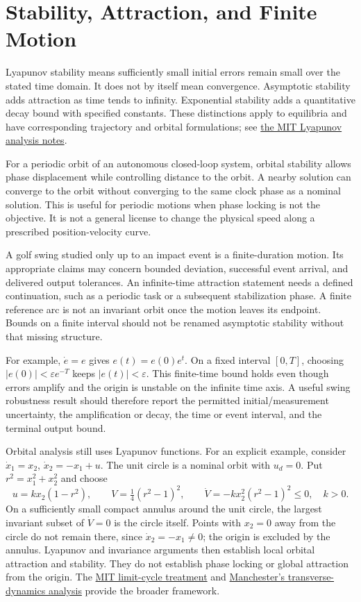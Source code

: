 \documentclass[12pt, openany]{book}
\theoremstyle{plain}
\begin{document}
\section{Stability, Attraction, and Finite Motion}

Lyapunov stability means sufficiently small initial errors remain small over
the stated time domain. It does not by itself mean convergence. Asymptotic
stability adds attraction as time tends to infinity. Exponential stability adds
a quantitative decay bound with specified constants. These distinctions apply
to equilibria and have corresponding trajectory and orbital formulations; see
\href{https://underactuated.mit.edu/lyapunov.html}{the MIT Lyapunov analysis notes}.

For a periodic orbit of an autonomous closed-loop system, orbital stability
allows phase displacement while controlling distance to the orbit. A nearby
solution can converge to the orbit without converging to the same clock phase
as a nominal solution. This is useful for periodic motions when phase locking
is not the objective. It is not a general license to change the physical speed
along a prescribed position-velocity curve.

A golf swing studied only up to an impact event is a finite-duration motion.
Its appropriate claims may concern bounded deviation, successful event arrival,
and delivered output tolerances. An infinite-time attraction statement needs
a defined continuation, such as a periodic task or a subsequent stabilization
phase. A finite reference arc is not an invariant orbit once the motion leaves
its endpoint. Bounds on a finite interval should not be renamed asymptotic
stability without that missing structure.

For example, $\dot e=e$ gives $e(t)=e(0)e^t$. On a fixed interval $[0,T]$,
choosing $|e(0)|<\varepsilon e^{-T}$ keeps $|e(t)|<\varepsilon$. This finite-time
bound holds even though errors amplify and the origin is unstable on the
infinite time axis. A useful swing robustness result should therefore report
the permitted initial/measurement uncertainty, the amplification or decay,
the time or event interval, and the terminal output bound.

Orbital analysis still uses Lyapunov functions. For an explicit example,
consider $\dot x_1=x_2$, $\dot x_2=-x_1+u$. The unit circle is a nominal orbit
with $u_d=0$. Put $r^2=x_1^2+x_2^2$ and choose
\begin{equation}
 u=kx_2(1-r^2),\qquad
 V=\tfrac14(r^2-1)^2,\qquad
 \dot V=-k x_2^2(r^2-1)^2\leq0,
 \quad k>0.
 \label{eq:motion_orbit_example}
\end{equation}
On a sufficiently small compact annulus around the unit circle, the largest
invariant subset of $\dot V=0$ is the circle itself. Points with $x_2=0$ away
from the circle do not remain there, since $\dot x_2=-x_1\ne0$; the origin is
excluded by the annulus. Lyapunov and invariance arguments then establish local
orbital attraction and stability. They do not establish phase locking or global
attraction from the origin. The
\href{https://underactuated.mit.edu/limit_cycles.html}{MIT limit-cycle treatment}
and \href{https://arxiv.org/abs/1010.2241}{Manchester's transverse-dynamics analysis}
provide the broader framework.
\end{document}
